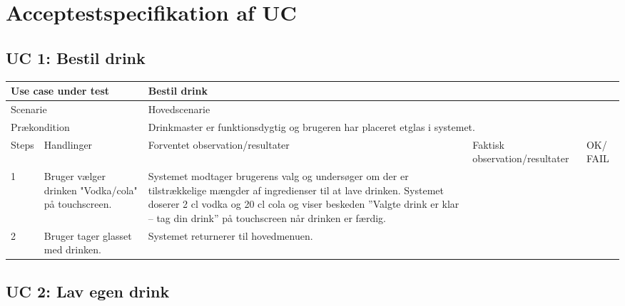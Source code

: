 \section{Acceptestspecifikation af UC}

\subsection{UC 1: Bestil drink}

\begin{table}[H]
\begin{tabular}{|p{1cm}|p{4cm}|p{4cm}|p{4cm}|p{1cm}|}
\hline
\multicolumn{2}{|p{5cm}|}{Use case under test} & \multicolumn{3}{p{9cm}|}{Bestil drink}                                       \\ \hline
\multicolumn{2}{|p{5cm}|}{Scenarie}            & \multicolumn{3}{p{9cm}|}{Hovedscenarie}                                          \\ \hline
\multicolumn{2}{|p{5cm}|}{Prækondition}        & \multicolumn{3}{p{9cm}|}{Drinkmaster er funktionsdygtig og brugeren har placeret etglas i systemet.}                                 \\ \hline
Steps               & Handlinger          & Forventet observation/resultater & Faktisk observation/resultater & OK/ FAIL \\ \hline
1    & Bruger vælger drinken "Vodka/cola" på touchscreen.  & Systemet modtager brugerens valg og undersøger om der er tilstrækkelige mængder af ingredienser til at lave drinken. Systemet doserer 2 cl vodka og 20 cl cola og viser beskeden ”Valgte drink er klar – tag din drink” på touchscreen når drinken er færdig. &   &         \\ \hline
2    & Bruger tager glasset med drinken.  & Systemet returnerer til hovedmenuen. &   &         \\ \hline

\end{tabular}
\end{table}

\subsection{UC 2: Lav egen drink}

